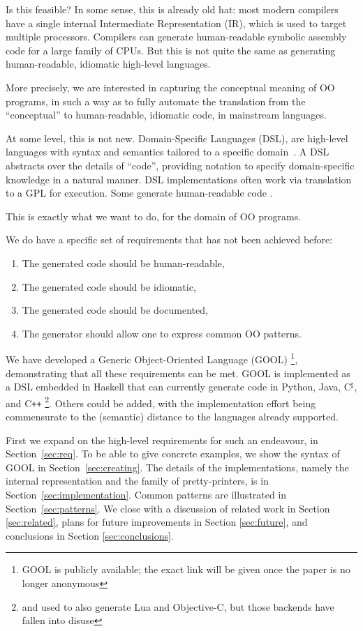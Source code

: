 \documentclass[sigplan,review,anonymous,prologue,dvipsnames]{acmart}
\newcommand{\Csharp}{C$^{\sharp}$}
\newcommand{\Cplusplus}{C\texttt{++}}
\begin{document}
Is this feasible? In some sense, this is already old hat: most
modern compilers have a single internal Intermediate Representation (IR),
which is used to target multiple processors. Compilers can generate
human-readable symbolic assembly code for a large family of CPUs. But this
is not quite the same as generating human-readable, idiomatic high-level
languages.

More precisely, we are interested in capturing the conceptual meaning of
OO programs, in such a way as to fully automate the translation from
the ``conceptual'' to human-readable, idiomatic code, in mainstream
languages.

At some level, this is not new.  Domain-Specific Languages (DSL),
are high-level languages with syntax and semantics tailored to a specific
domain~\cite{mernik2005and}.  A DSL
abstracts over the details of ``code'', providing notation to
specify domain-specific knowledge in a natural manner. DSL implementations
often work via translation to a GPL for execution.  Some generate
human-readable code \cite{wang1997zephyr, mooij2013gaining, hong2012green, 
beyak2011saga}.

This is exactly what we want to do, for the domain of OO programs.

We do have a specific set of requirements that has not been achieved
before:
\begin{enumerate}
\item The generated code should be human-readable,
\item The generated code should be idiomatic,
\item The generated code should be documented,
\item The generator should allow one to express common OO patterns.
\end{enumerate}

We have developed a Generic Object-Oriented Language (GOOL)%
\footnote{GOOL is publicly available; the exact link will be
given once the paper is no longer anonymous}, demonstrating that all these
requirements can be met.  GOOL is implemented as a DSL embedded in Haskell that
can currently generate code in Python, Java, \Csharp, and \Cplusplus%
\footnote{and used to also generate Lua and Objective-C, but those backends
have fallen into disuse}. Others could be added, with the implementation
effort being commensurate to the (semantic) distance to the languages
already supported.

First we expand on the high-level requirements for such an endeavour, in
Section~\ref{sec:req}.  To be able to give concrete examples, we
show the syntax of GOOL in Section~\ref{sec:creating}. The details of
the implementations, namely the internal representation and the
family of pretty-printers, is in Section~\ref{sec:implementation}.
Common patterns are illustrated in Section~\ref{sec:patterns}.  We
close with a discussion of related work in Section \ref{sec:related}, plans for
future improvements in Section \ref{sec:future}, and conclusions in Section
\ref{sec:conclusions}.
\end{document}
